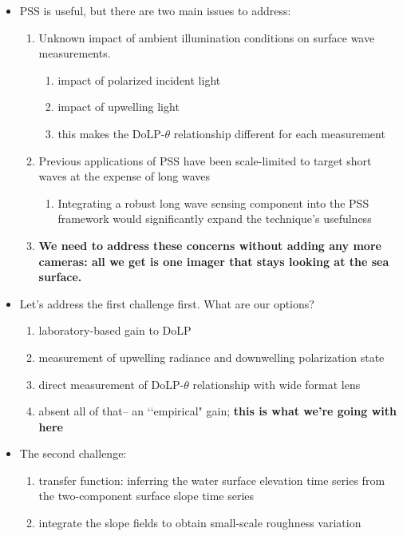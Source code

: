 \documentclass[letterpaper,journal]{IEEEtran}
\begin{document}
\begin{itemize}
    \item PSS is useful, but there are two main issues to address:
    \begin{enumerate}
        \item Unknown impact of ambient illumination conditions on surface wave measurements.
        \begin{enumerate}
        \item impact of polarized incident light
        \item impact of upwelling light
        \item this makes the DoLP-$\theta$ relationship different for each measurement
    \end{enumerate}
        \item Previous applications of PSS have been scale-limited to target short waves at the expense of long waves
        \begin{enumerate}
            \item Integrating a robust long wave sensing component into the PSS framework would significantly expand the technique's usefulness
        \end{enumerate}
        \item \textbf{We need to address these concerns without adding any more cameras: all we get is one imager that stays looking at the sea surface.}
    \end{enumerate}
    \item Let's address the first challenge first. What are our options?
    \begin{enumerate}
        \item laboratory-based gain to DoLP
        \item measurement of upwelling radiance and downwelling polarization state
        \item direct measurement of DoLP-$\theta$ relationship with wide format lens
        \item absent all of that-- an \lq\lq empirical" gain; \textbf{this is what we're going with here}
    \end{enumerate}
    \item The second challenge:
    \begin{enumerate}
        \item transfer function: inferring the water surface elevation time series from the two-component surface slope time series
        \item integrate the slope fields to obtain small-scale roughness variation

\end{enumerate}
\end{itemize}
\end{document}
